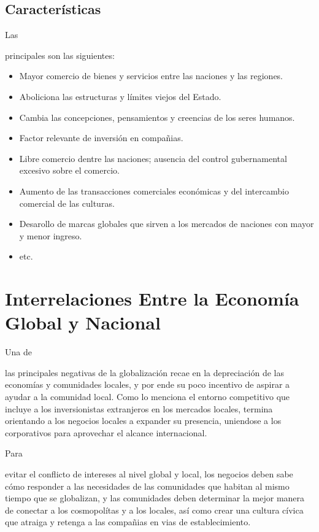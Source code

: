\documentclass[stu, 12pt, letterpaper, donotrepeattitle, floatsintext, natbib]{apa7}
\begin{document}
\subsection{Características}
Las \begin{justifying}
  principales son las siguientes: \citep{unknown-author-no-date} %
  \begin{itemize}
    \item Mayor comercio de bienes y servicios entre las naciones y las regiones.
    \item Aboliciona las estructuras y límites viejos del Estado.
    \item Cambia las concepciones, pensamientos y creencias de los seres humanos.
    \item Factor relevante de inversión en compañias.
    \item Libre comercio dentre las naciones; ausencia del control gubernamental excesivo sobre el comercio.
    \item Aumento de las transacciones comerciales económicas y del intercambio comercial de las culturas.
    \item Desarollo de marcas globales que sirven a los mercados de naciones con mayor y menor ingreso.
    \item etc.
  \end{itemize}\par
\end{justifying}
\vspace{\baselineskip}
\section{Interrelaciones Entre la Economía Global y Nacional}
Una de \begin{justifying}
  las principales negativas de la globalización recae en la depreciación de las economías y comunidades locales, y por ende
  su poco incentivo de aspirar a ayudar a la comunidad local. Como lo menciona \cite{kanter-2014} %
  el entorno competitivo que incluye a los inversionistas extranjeros en los mercados locales, termina orientando a los
  negocios locales a expander su presencia, uniendose a los corporativos para aprovechar el alcance internacional.
\end{justifying}
Para \begin{justifying}
  evitar el conflicto de intereses al nivel global y local, los negocios deben sabe cómo responder
  a las necesidades de las comunidades que habitan al mismo tiempo que se globalizan, y las comunidades deben determinar
  la mejor manera de conectar a los cosmopolítas y a los locales, así como crear una cultura cívica que atraiga y retenga
  a las compañias en vias de establecimiento.\par
\end{justifying}
\vspace{\baselineskip}
\end{document}
